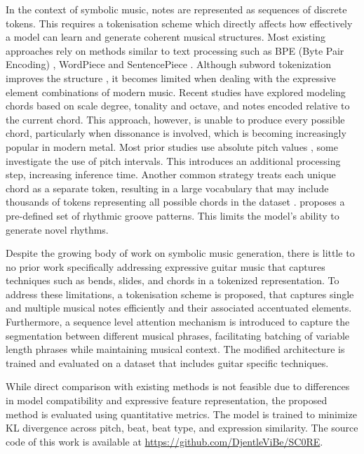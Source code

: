 \documentclass{article}
\begin{document}
In the context of symbolic music, notes are represented as sequences of discrete tokens. This requires a tokenisation scheme which directly affects how effectively a 
model can learn and generate coherent musical structures. Most existing approaches rely on methods similar to text 
processing such as BPE (Byte Pair Encoding) \cite{sennrich2016neuralmachinetranslationrare}, WordPiece \cite{sentencepiece}
and SentencePiece \cite{kudo2018sentencepiecesimplelanguageindependent}. Although subword tokenization improves 
the structure \cite{kumar2023wordsmusicstudysubword} \cite{bpe-symbolic-music},
it becomes limited when dealing with the expressive element combinations of modern music. Recent studies 
\cite{gardin2024musiclang} have explored modeling chords based on scale degree, tonality and octave, and 
notes encoded relative to the current chord. This approach, however, is unable to produce every possible chord, 
particularly when dissonance is involved, which is becoming increasingly popular in modern metal. 
Most prior studies use absolute pitch values \cite{aws_deepcomposer}, some \cite{kermarec2022tokenization} investigate the use of pitch intervals.
This introduces an additional processing step, increasing inference time. Another common strategy treats each 
unique chord as a separate token, resulting in a large vocabulary that may include thousands of tokens 
representing all possible chords in the dataset \cite{harmony} \cite{Chordinator}. 
\cite{chen2020automatic} proposes a pre-defined set of rhythmic groove patterns. This limits the model's ability to generate novel rhythms. 

Despite the growing body of work on symbolic music generation, there is little to no prior work 
specifically addressing expressive guitar music that captures techniques such as bends, slides, 
and chords in a tokenized representation. To address these limitations, a tokenisation scheme is proposed, that captures single and multiple musical notes efficiently and 
their associated accentuated elements. Furthermore, a sequence level attention mechanism is introduced to capture the segmentation
between different musical phrases, facilitating batching of variable length phrases while maintaining musical context.
The modified architecture is trained and evaluated on a dataset \cite{SCORESET} that includes guitar specific techniques.

While direct comparison with existing methods is not feasible due to differences in 
model compatibility and expressive feature representation, the proposed method is 
evaluated using quantitative metrics. The model is trained to minimize KL 
divergence across pitch, beat, beat type, and expression similarity. The source code of this work is available at \url{https://github.com/DjentleViBe/SC0RE}.
\end{document}
